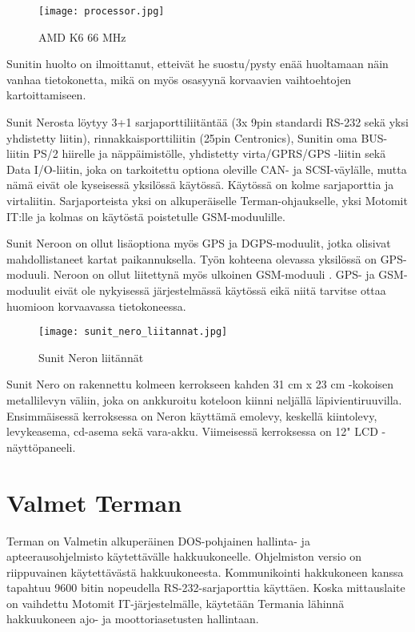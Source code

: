 \begin{figure}[H]
\centering
\texttt{[image: processor.jpg]}
\caption{AMD K6 66 MHz}
\end{figure}

Sunitin huolto on ilmoittanut, etteivät he suostu/pysty enää huoltamaan näin vanhaa tietokonetta, mikä on myös osasyynä korvaavien vaihtoehtojen kartoittamiseen.

Sunit Nerosta löytyy 3+1 sarjaporttiliitäntää (3x 9pin standardi RS-232 sekä yksi yhdistetty liitin), rinnakkaisporttiliitin (25pin Centronics), Sunitin oma BUS-liitin PS/2 hiirelle ja näppäimistölle, yhdistetty virta/GPRS/GPS -liitin sekä Data I/O-liitin, joka on tarkoitettu optiona oleville CAN- ja SCSI-väylälle, mutta nämä eivät ole kyseisessä yksilössä käytössä.  Käytössä on kolme sarjaporttia ja virtaliitin. Sarjaporteista yksi on alkuperäiselle Terman-ohjaukselle, yksi Motomit IT:lle ja kolmas on käytöstä poistetulle GSM-moduulille.

Sunit Neroon on ollut lisäoptiona myös GPS ja DGPS-moduulit, jotka olisivat mahdollistaneet kartat paikannuksella. Työn kohteena olevassa yksilössä on GPS-moduuli. Neroon on ollut liitettynä myös ulkoinen GSM-moduuli \cite{nero:manual}. GPS- ja GSM-moduulit eivät ole nykyisessä järjestelmässä käytössä eikä niitä tarvitse ottaa huomioon korvaavassa tietokoneessa.\newline\newline

\begin{figure}[H]
\centering
\texttt{[image: sunit\_nero\_liitannat.jpg]}
\caption{Sunit Neron liitännät}
\end{figure}

Sunit Nero on rakennettu kolmeen kerrokseen kahden 31 cm x 23 cm -kokoisen metallilevyn väliin, joka on ankkuroitu koteloon kiinni neljällä  läpivientiruuvilla. Ensimmäisessä kerroksessa on Neron käyttämä emolevy, keskellä kiintolevy, levykeasema, cd-asema sekä vara-akku. Viimeisessä kerroksessa on 12" LCD -näyttöpaneeli.

\section{Valmet Terman}
Terman on Valmetin alkuperäinen DOS-pohjainen hallinta- ja apteerausohjelmisto käytettävälle hakkuukoneelle. Ohjelmiston versio on riippuvainen käytettävästä hakkuukoneesta. Kommunikointi hakkukoneen kanssa tapahtuu 9600 bitin nopeudella RS-232-sarjaporttia käyttäen. Koska mittauslaite on vaihdettu Motomit IT-järjestelmälle, käytetään Termania lähinnä hakkuukoneen ajo- ja moottoriasetusten hallintaan.
\newline\newline

